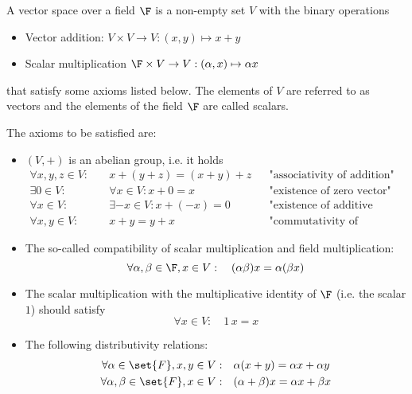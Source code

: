 \begin{defn}
	A vector space over a field $\F$ is a non-empty set $V$
	with the binary operations
	\begin{itemize}
		\item Vector addition: $V \times V \to V : (x,y) \mapsto x+y$
		\item Scalar multiplication $\F \times V \to V: (\alpha,x) \mapsto \alpha x$
	\end{itemize}
	that satisfy some axioms listed below. The elements of $V$ are referred to as vectors
	and the elements of the field $\F$ are called scalars.

	The axioms to be satisfied are:
	\begin{itemize}
		\item $(V,+)$ is an abelian group, i.e. it holds
		\begin{align}
			\label{eqn:vectorAss}        \forall x,y,z \in V: &\quad x + (y + z) = (x + y) + z		&&\text{"associativity of addition"} \\
			\label{eqn:vectorZero}       \exists 0 \in V: &\quad \forall x \in V : x + 0 = x		&&\text{"existence of zero vector"} \\
			\label{eqn:vectorInverse}    \forall x \in V: &\quad \exists -x \in V : x + (-x) = 0	&&\text{"existence of additive inverses"} \\
			\label{eqn:vectorComm}       \forall x,y \in V: &\quad x + y = y + x			&&\text{"commutativity of addition"}
		\end{align}
		\item The so-called compatibility of scalar multiplication and
			field multiplication:
			\begin{equation}
				\forall \alpha,\beta \in \F, x \in V: \quad (\alpha \beta) x = \alpha (\beta x)
				\label{eqn:vectorCompField}
			\end{equation}
		\item The scalar multiplication with the multiplicative identity of
			$\F$ (i.e. the scalar $1$) should satisfy
			\begin{equation}
				\forall x \in V: \quad 1\, x = x
				\label{eqn:vectorMultIdent}
			\end{equation}
		\item The following distributivity relations:
			\begin{align}
				\label{eqn:vectorDistrVecAdd}\forall \alpha \in \set{F}, x,y \in V: & \quad \alpha (x+y) = \alpha x + \alpha y\\
				\label{eqn:vectorDistrFldAdd}\forall \alpha,\beta \in \set{F}, x \in V: & \quad (\alpha + \beta) x = \alpha x + \beta x
			\end{align}
	\end{itemize}
\end{defn}

